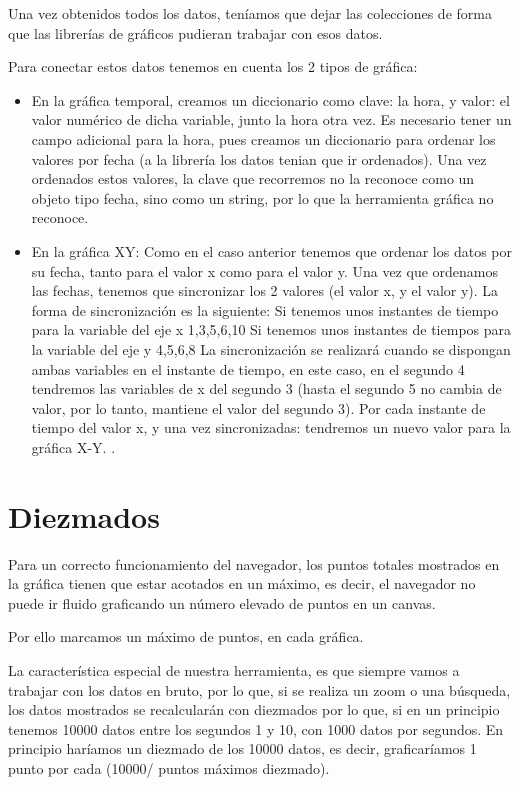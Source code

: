 Una vez obtenidos todos los datos, teníamos que dejar las colecciones de forma que las librerías de gráficos pudieran trabajar con esos datos.

Para conectar estos datos tenemos en cuenta los 2 tipos de gráfica:
\begin{itemize}
	\item En la gráfica temporal, creamos un diccionario como clave: la hora, y valor: el valor numérico de dicha variable, junto la hora otra vez.
Es necesario tener un campo adicional para la hora, pues creamos un diccionario para ordenar los valores por fecha (a la librería los datos tenian que ir ordenados).
Una vez ordenados estos valores, la clave que recorremos no la reconoce como un objeto tipo fecha, sino como un string, por lo que la herramienta gráfica no reconoce.

	\item En la gráfica XY: Como en el caso anterior tenemos que ordenar los datos por su fecha, tanto para el valor x como para el valor y.
Una vez que ordenamos las fechas, tenemos que sincronizar los 2 valores (el valor x, y el valor y). La forma de sincronización es la siguiente:
Si tenemos unos instantes de tiempo para la variable del eje x {1,3,5,6,10}
Si tenemos unos instantes de tiempos para la variable del eje y {4,5,6,8}
La sincronización se realizará cuando se dispongan ambas variables en el instante de tiempo, en este caso, en el segundo 4 tendremos las variables de x del segundo 3 (hasta el segundo 5 no cambia de valor, por lo tanto, mantiene el valor del segundo 3).
Por cada instante de tiempo del valor x, y una vez sincronizadas: tendremos un nuevo valor para la gráfica X-Y.
.
\end{itemize}


\section{Diezmados}

Para un correcto funcionamiento del navegador, los puntos totales mostrados en la gráfica tienen que estar acotados en un máximo, es decir, el navegador no puede ir fluido graficando un número elevado de puntos en un canvas.

Por ello marcamos un máximo de puntos, en cada gráfica.

La característica especial de nuestra herramienta, es que siempre vamos a trabajar con los datos en bruto, por lo que, si se realiza un zoom o una búsqueda, los datos mostrados se recalcularán con diezmados por lo que, si en un principio tenemos 10000 datos entre los segundos 1 y 10, con 1000 datos por segundos. En principio haríamos un diezmado de los 10000 datos, es decir, graficaríamos 1 punto por cada (10000/ {puntos máximos diezmado}).

